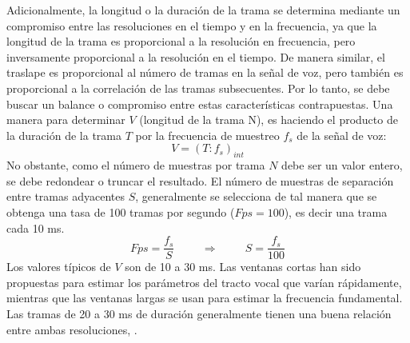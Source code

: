 \begin{enumerate}
\vskip 0.5cm
Adicionalmente, la longitud o la duración de la trama se determina mediante un compromiso entre las resoluciones en el tiempo y en la frecuencia, ya que la longitud de la trama es proporcional a la resolución en frecuencia, pero inversamente proporcional a la resolución en el tiempo. De manera similar, el traslape es proporcional al número de tramas en la señal de voz, pero también es proporcional a la correlación de las tramas subsecuentes. Por lo tanto, se debe buscar un balance o compromiso entre estas características contrapuestas. Una manera para determinar $V$ (longitud de la trama N), es haciendo el producto de la duración de la trama $T$ por la frecuencia de muestreo $f_{s}$ de la señal de voz:
\begin{equation}
\label{eq:ecuacion38}
V = (T:f_{s})_{int}
\end{equation}
No obstante, como el número de muestras por trama $N$ debe ser un valor entero, se debe redondear o truncar el resultado. El número de muestras de separación entre tramas adyacentes $S$, generalmente se selecciona de tal manera que se obtenga una tasa de 100 tramas por segundo ($Fps = 100$), es decir una trama cada 10 ms.
\begin{equation}
\label{eq:ecuacion39}
Fps = \frac{f_{s}}{S} \hspace{1cm} \Rightarrow \hspace{1cm} S = \frac{f_{s}}{100}
\end{equation}
Los valores típicos de $V$ son de 10 a 30 ms. Las ventanas cortas han sido propuestas para estimar los parámetros del tracto vocal que varían rápidamente, mientras que las ventanas largas se usan para estimar la frecuencia fundamental. Las tramas de 20 a 30 ms de duración generalmente tienen una buena relación entre ambas resoluciones, \cite{eyra}.
\end{enumerate}

